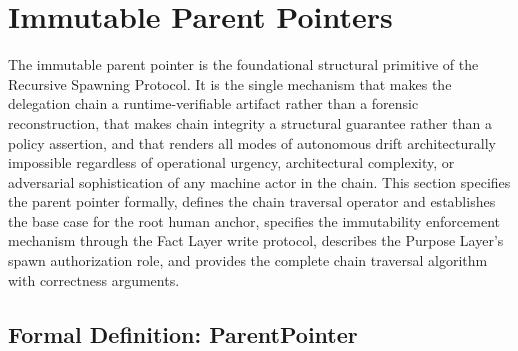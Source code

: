 \section{Immutable Parent Pointers}
\label{sec:immutable-parent-pointers}

The immutable parent pointer is the foundational structural primitive of the Recursive Spawning Protocol. It is the single mechanism that makes the delegation chain a runtime-verifiable artifact rather than a forensic reconstruction, that makes chain integrity a structural guarantee rather than a policy assertion, and that renders all modes of autonomous drift architecturally impossible regardless of operational urgency, architectural complexity, or adversarial sophistication of any machine actor in the chain. This section specifies the parent pointer formally, defines the chain traversal operator and establishes the base case for the root human anchor, specifies the immutability enforcement mechanism through the Fact Layer write protocol, describes the Purpose Layer's spawn authorization role, and provides the complete chain traversal algorithm with correctness arguments.

\subsection{Formal Definition: ParentPointer}
\label{sec:parent-pointer-definition}

